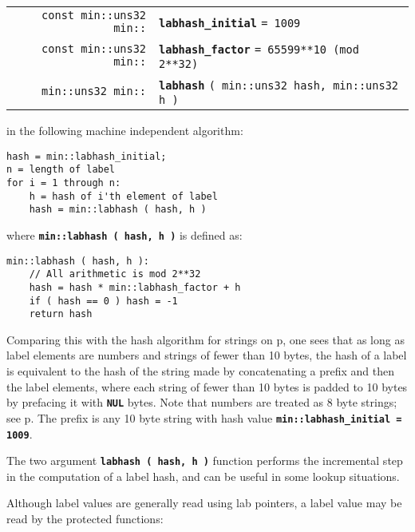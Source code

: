 \documentclass[12pt]{article}
\makeatletter
\newcommand{\TT}[1]{{\tt \bfseries #1}}
\newcommand{\ttindex}[1]{\index{#1@{\tt #1}}}
\newcommand{\pagref}[1]{p\pageref{#1}}
\newcommand{\EOL}{\penalty \exhyphenpenalty}
\newenvironment{indpar}[1][0.3in]%
	{\begin{list}{}%
		     {\setlength{\itemsep}{0in}%
		      \setlength{\topsep}{0in}%
		      \setlength{\parsep}{1ex}%
		      \setlength{\labelwidth}{#1}%
		      \setlength{\leftmargin}{#1}%
		      \addtolength{\leftmargin}{\labelsep}}%
	 \item}%
	{\end{list}}
\newcommand{\LABEL}[1]{\label{#1}}
\newcommand{\MINKEY}[1]%
	   {\TT{#1}\ttindex{min::#1}\ttindex{#1}}
\makeatother
\begin{document}
\begin{indpar}\begin{tabular}{r@{}l}
\verb|const min::uns32 min::| & \MINKEY{labhash\_initial} \verb|= 1009|
\LABEL{MIN::LABHASH_INITIAL} \\
\verb|const min::uns32 min::| & \MINKEY{labhash\_factor}
    \verb|= 65599**10 (mod 2**32)|
\LABEL{MIN::LABHASH_FACTOR} \\
\verb|min::uns32 min::| & \MINKEY{labhash}
     \verb|( min::uns32 hash, min::uns32 h )|
\LABEL{MIN::LABHASH_INCREMENTAL} \\
\end{tabular}\end{indpar}

in the following machine independent algorithm:\label{LABEL-HASH-ALGORITHM}

\begin{indpar}\begin{verbatim}
hash = min::labhash_initial;
n = length of label
for i = 1 through n:
    h = hash of i'th element of label
    hash = min::labhash ( hash, h )
\end{verbatim}\end{indpar}

where \TT{min::labhash ( hash, h )} is defined as:

\begin{indpar}\begin{verbatim}
min::labhash ( hash, h ):
    // All arithmetic is mod 2**32
    hash = hash * min::labhash_factor + h
    if ( hash == 0 ) hash = -1
    return hash
\end{verbatim}\end{indpar}

Comparing this with the hash algorithm for strings
on \pagref{HASH-ALGORITHM}, one sees that as long as
label elements are numbers and strings of fewer than 10 bytes,
the hash of a label is equivalent to the hash of the
string made by concatenating a prefix and then the label elements, where each
string of fewer than 10 bytes is padded to 10 bytes
by prefacing it with \TT{NUL} bytes.  Note that
numbers are treated as 8 byte strings; see
\pagref{NUMBER-HASH-ALGORITHM}.  The prefix is any 10 byte string with
hash value \TT{min::\EOL labhash\_\EOL initial = 1009}.

The two argument \TT{labhash ( hash, h )} function performs the
incremental step in the computation of a label hash, and can be useful
in some lookup situations.

Although label values are generally read using lab pointers,
a label value may be read by the protected functions:
\end{document}
